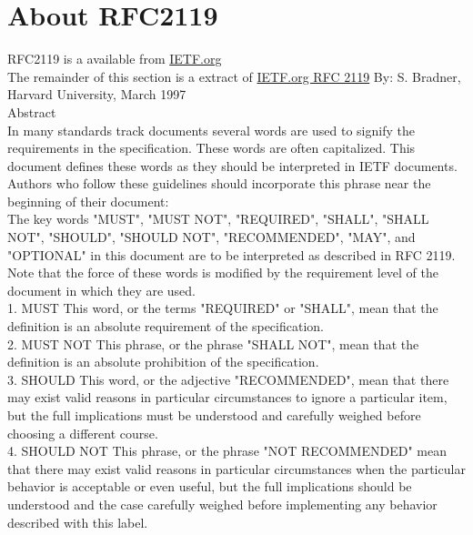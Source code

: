 \section{About RFC2119}
\label{sec:RFC2119}
\gls{RFC2119} is a available from \href{https://tools.ietf.org/html/rfc2119}{IETF.org}\\

The remainder of this section is a extract of \href{https://tools.ietf.org/html/rfc2119}{IETF.org RFC 2119}
By: S. Bradner, Harvard University, March 1997\\

Abstract\\

   In many standards track documents several words are used to signify
   the requirements in the specification.  These words are often
   capitalized.  This document defines these words as they should be
   interpreted in IETF documents.  Authors who follow these guidelines
   should incorporate this phrase near the beginning of their document:\\

      The key words "MUST", "MUST NOT", "REQUIRED", "SHALL", "SHALL
      NOT", "SHOULD", "SHOULD NOT", "RECOMMENDED",  "MAY", and
      "OPTIONAL" in this document are to be interpreted as described in
      RFC 2119.\\

   Note that the force of these words is modified by the requirement
   level of the document in which they are used.\\

1. MUST   This word, or the terms "REQUIRED" or "SHALL", mean that the
   definition is an absolute requirement of the specification.\\

2. MUST NOT   This phrase, or the phrase "SHALL NOT", mean that the
   definition is an absolute prohibition of the specification.\\

3. SHOULD   This word, or the adjective "RECOMMENDED", mean that there
   may exist valid reasons in particular circumstances to ignore a
   particular item, but the full implications must be understood and
   carefully weighed before choosing a different course.\\

4. SHOULD NOT   This phrase, or the phrase "NOT RECOMMENDED" mean that
   there may exist valid reasons in particular circumstances when the
   particular behavior is acceptable or even useful, but the full
   implications should be understood and the case carefully weighed
   before implementing any behavior described with this label.\\

